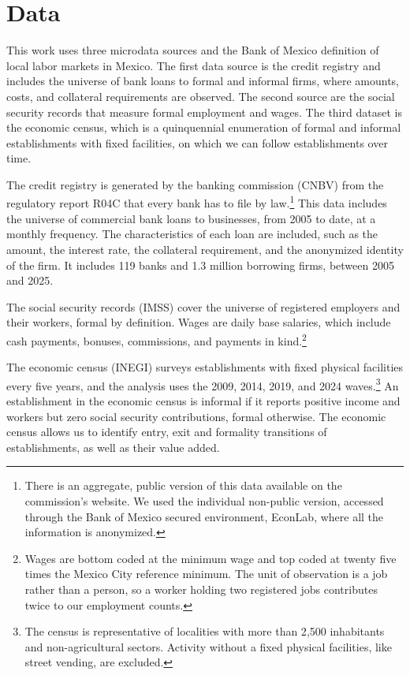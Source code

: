 \documentclass[12pt]{article}
\begin{document}
\section{Data}
\label{sec:data}

This work uses three microdata sources and the Bank of Mexico definition of local labor markets in Mexico. The first data source is the credit registry and includes the universe of bank loans to formal and informal firms, where amounts, costs, and collateral requirements are observed. The second source are the social security records that measure formal employment and wages. The third dataset is the economic census, which is a quinquennial enumeration of formal and informal establishments with fixed facilities, on which we can follow establishments over time. 

The credit registry is generated by the banking commission (CNBV) from the regulatory report R04C that every bank has to file by law.\footnote{There is an aggregate, public version of this data available on the commission's website. We used the individual non-public version, accessed through the Bank of Mexico secured environment, EconLab, where all the information is anonymized.} This data includes the universe of commercial bank loans to businesses, from 2005 to date, at a monthly frequency. The characteristics of each loan are included, such as the amount, the interest rate, the collateral requirement, and the anonymized identity of the firm. It includes 119 banks and 1.3 million borrowing firms, between 2005 and 2025.

The social security records (IMSS) cover the universe of registered employers and their workers, formal by definition. Wages are daily base salaries, which include cash payments, bonuses, commissions, and payments in kind.\footnote{Wages are bottom coded at the minimum wage and top coded at twenty five times the Mexico City reference minimum. The unit of observation is a job rather than a person, so a worker holding two registered jobs contributes twice to our employment counts.}

The economic census (INEGI) surveys establishments with fixed physical facilities every five years, and the analysis uses the 2009, 2014, 2019, and 2024 waves.\footnote{The census is representative of localities with more than 2{,}500 inhabitants and non-agricultural sectors. Activity without a fixed physical facilities, like street vending, are excluded.} An establishment in the economic census is informal if it reports positive income and workers but zero social security contributions, formal otherwise. The economic census allows us to identify entry, exit and formality transitions of establishments, as well as their value added.
\end{document}

